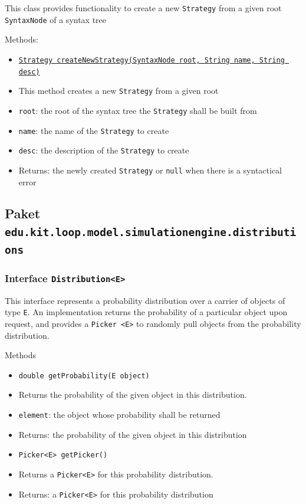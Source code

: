 \documentclass[parskip=full,11pt]{scrartcl}
\begin{document}
This class provides functionality to create a new \texttt{Strategy} from a given root \texttt{SyntaxNode} of a syntax tree

Methods:
\begin{itemize} \itemsep -10pt
	\item \underline{\texttt{Strategy createNewStrategy(SyntaxNode root, String name, String desc)}}
	\item[] This method creates a new \texttt{Strategy} from a given root
	\item[] \texttt{root}: the root of the syntax tree the \texttt{Strategy} shall be built from
	\item[] \texttt{name}: the name of the \texttt{Strategy} to create
	\item[] \texttt{desc}: the description of the \texttt{Strategy} to create
	\item[] Returns: the newly created \texttt{Strategy} or \texttt{null} when there is a syntactical error
\end{itemize}


\subsection{Paket \texttt{edu.kit.loop.model.simulationengine.distributions}}

\subsubsection{Interface \texttt{Distribution<E>}}
This interface represents a probability distribution over a carrier of objects of type \texttt{E}. An implementation returns the probability of a particular object upon request, and provides a \texttt{Picker <E>} to randomly pull objects from the probability distribution.

Methods
\begin{itemize}\itemsep -10pt
\item \texttt{double getProbability(E object)}
\item[] Returns the probability of the given object in this distribution.
\item[] \texttt{element}: the object whose probability shall be returned
\item[] Returns: the probability of the given object in this distribution

\item \texttt{Picker<E> getPicker()}
\item[] Returns a \texttt{Picker<E>} for this probability distribution.
\item[] Returns: a \texttt{Picker<E>} for this probability distribution
\end{itemize}
\end{document}
